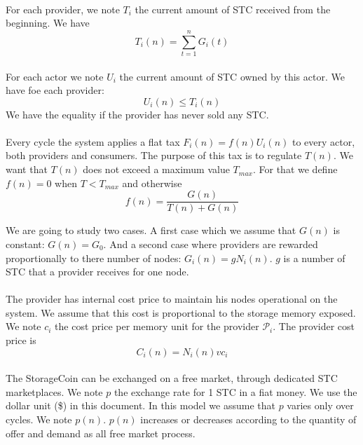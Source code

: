\documentclass[a4paper,12pt]{article}
\begin{document}
\paragraph*{}
For each provider, we note $T_{i}$ the current amount of STC received from the beginning. We have
\[T_{i}(n)=\sum\limits_{t=1}^n G_{i}(t)\]

\paragraph*{}
For each actor we note $U_{i}$ the current amount of STC owned by this actor. We have foe each provider: 
\[U_{i}(n)\le{T_{i}(n)}\]
We have the equality if the provider has never sold any STC.

\paragraph*{}
Every cycle the system applies a flat tax $F_{i}(n)=f(n)U_{i}(n)$ to every actor, both providers and consumers. The purpose of this tax is to regulate $T(n)$. 
We want that $T(n)$ does not exceed a maximum value $T_{max}$. 
For that we define $f(n)=0$ when $T<T_{max}$ and otherwise \[f(n)=\frac{G(n)}{T(n)+G(n)}\]

We are going to study two cases. 
A first case which we assume that $G(n)$ is constant: $G(n)=G_{0}$. 
And a second case where providers are rewarded proportionally to there number of nodes: $G_{i}(n)=gN_{i}(n)$. 
$g$ is a number of STC that a provider receives for one node.

\paragraph*{}
The provider has internal cost price to maintain his nodes operational on the system. We assume that this cost is proportional to the storage memory exposed. We note $c_{i}$ the cost price per memory unit for the provider $\mathscr{P}_{i}$. The provider cost price is
\[C_{i}(n)=N_{i}(n)vc_{i}\]

\paragraph*{}
The StorageCoin can be exchanged on a free market, through dedicated STC marketplaces. We note $p$ the exchange rate for 1 STC in a fiat money. We use the dollar unit (\$) in this document.
In this model we assume that $p$ varies only over cycles. We note $p(n)$.
$p(n)$ increases or decreases according to the quantity of offer and demand as all free market process.
\end{document}

